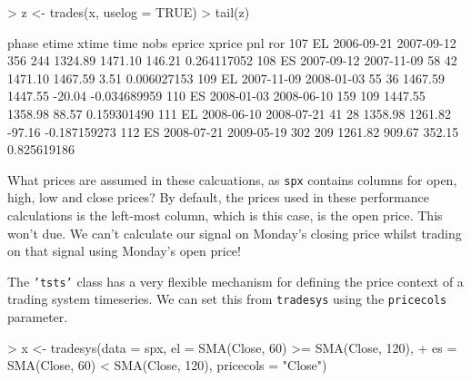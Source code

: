 \documentclass[a4]{article}
\newcommand{\code}[1]{\texttt{#1}}
\begin{document}
\begin{Schunk}
\begin{Sinput}
> z <- trades(x, uselog = TRUE)
> tail(z)
\end{Sinput}
\begin{Soutput}
    phase      etime      xtime time nobs  eprice  xprice    pnl          ror
107    EL 2006-09-21 2007-09-12  356  244 1324.89 1471.10 146.21  0.264117052
108    ES 2007-09-12 2007-11-09   58   42 1471.10 1467.59   3.51  0.006027153
109    EL 2007-11-09 2008-01-03   55   36 1467.59 1447.55 -20.04 -0.034689959
110    ES 2008-01-03 2008-06-10  159  109 1447.55 1358.98  88.57  0.159301490
111    EL 2008-06-10 2008-07-21   41   28 1358.98 1261.82 -97.16 -0.187159273
112    ES 2008-07-21 2009-05-19  302  209 1261.82  909.67 352.15  0.825619186
\end{Soutput}
\end{Schunk}
What prices are assumed in these calcuations, as \code{spx} contains
columns for open, high, low and close prices? By default, the prices
used in these performance calculations is the left-most column, which
is this case, is the open price. This won't due. We can't calculate
our signal on Monday's closing price whilst trading on that signal
using Monday's open price! 

The \code{'tsts'} class has a very flexible mechanism for defining the
price context of a trading system timeseries. We can set this from
\code{tradesys} using the \code{pricecols} parameter.
\begin{Schunk}
\begin{Sinput}
> x <- tradesys(data = spx, el = SMA(Close, 60) >= SMA(Close, 120), 
+     es = SMA(Close, 60) < SMA(Close, 120), pricecols = "Close")
\end{Sinput}
\end{Schunk}
\end{document}
